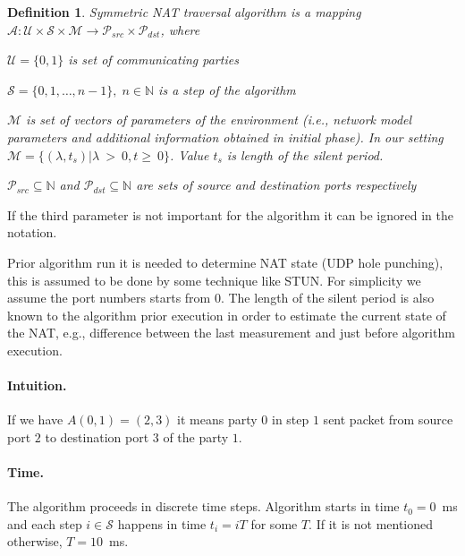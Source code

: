 \documentclass[twoside]{article}
\newtheorem{mydef}{Definition}
\begin{document}
\begin{multicols}{2}
\begin{mydef}
Symmetric NAT traversal algorithm is a mapping 
$\mathcal{A}: \mathcal{U} \times \mathcal{S} \times \mathcal{M} \rightarrow \mathcal{P}_{src} \times \mathcal{P}_{dst}$, 
where \\
\begin{compactitem}
\item $\mathcal{U}=\{0,1\}$ is set of communicating parties
\item $\mathcal{S} = \{0, 1, \dots, n-1\}, \; n \in \mathbb{N}$ is a step of the algorithm
\item $\mathcal{M}$ is set of vectors of parameters of the environment (i.e., network model 
parameters and additional information obtained in initial phase). 
In our setting $\mathcal{M} = \{ (\lambda, t_s) | \lambda~>~0, t\geq~0 \}$. Value $t_s$ is length of the silent period. %
\item $\mathcal{P}_{src} \subseteq \mathbb{N}$ and $\mathcal{P}_{dst} \subseteq \mathbb{N}$
are sets of source and destination ports respectively
\end{compactitem}
\end{mydef}
If the third parameter is not important for the algorithm it can be ignored in the notation. 

Prior algorithm run it is needed to 
determine NAT state (UDP hole punching), this is assumed to be done by some technique like STUN. For simplicity we assume the port numbers
starts from $0$. The length of the silent period is also known to the algorithm prior execution in order to estimate the current state of 
the NAT, e.g., difference between the last measurement and just before algorithm execution.

\paragraph{Intuition.} 
If we have $A(0,1) = (2,3)$ it means party $0$ in step $1$ sent packet from source port $2$ to destination port $3$
of the party $1$.

\paragraph{Time.} 
The algorithm proceeds in discrete time steps. Algorithm starts in time $t_0 = 0$~ms and each step $i \in \mathcal{S}$
happens in time $t_i = iT$ for some $T$. If it is not mentioned otherwise, $T = 10$~ms.


\end{multicols}
\end{document}
